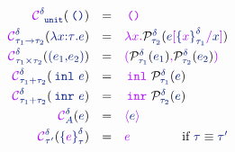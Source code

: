 \[
\begin{array}{r l l}
  \tcoerce{\stunit}{\sdelta}{\sunit} & = & \tunit
  \\[0.3em]
  \tcoerce{\sarrow{\staui}{\stauii}}{\sdelta}{\sabs{\svar{x}}{\stau}{\sexp}} & = &
  \tabs{\tvar{x}}{\prot{\sexp\tsubst{\svar{x}}{\salien{\tvar{x}}{\staui}{\sdelta}}} {\stauii} {\sdelta}}
  \\[0.3em]
  \tcoerce{\sprod{\staui}{\stauii}}{\sdelta}{\spair{\sexpi}{\sexpii}} & = &
  \tpair{\prot{\sexpi}{\staui}{\sdelta}}{\prot{\sexpii}{\stauii}{\sdelta}}
  \\[0.3em]
  \tcoerce{\ssum{\staui}{\stauii}}{\sdelta}{\sinl{\sexp}} & = &
  \tinl{\prot{\sexp}{\staui}{\sdelta}}
  \\[0.3em]
  \tcoerce{\ssum{\staui}{\stauii}}{\sdelta}{\sinr{\sexp}} & = &
  \tinr{\prot{\sexp}{\stauii}{\sdelta}}
  \\[0.3em]
  \tcoerce{\svar{A}}{\sdelta}{\sexp} & = & \topaque{\sexp}
  \\[0.3em]
  \tcoerce{\staup}{\sdelta}{\salien{\texp}{\stau}{\sdelta}} & = & \texp
  \hfill \text{if } \stau \equiv \staup
  \\[0.3em]
\end{array}
\]
